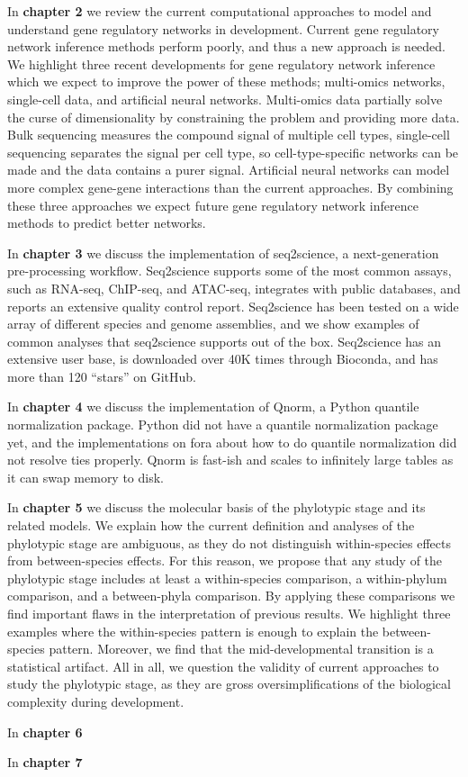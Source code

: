 In \textbf{chapter 2} we review the current computational approaches to model and understand gene regulatory networks in development. Current gene regulatory network inference methods perform poorly, and thus a new approach is needed. We highlight three recent developments for gene regulatory network inference which we expect to improve the power of these methods; multi-omics networks, single-cell data, and artificial neural networks. Multi-omics data partially solve the curse of dimensionality by constraining the problem and providing more data. Bulk sequencing measures the compound signal of multiple cell types, single-cell sequencing separates the signal per cell type, so cell-type-specific networks can be made and the data contains a purer signal. Artificial neural networks can model more complex gene-gene interactions than the current approaches. By combining these three approaches we expect future gene regulatory network inference methods to predict better networks.

In \textbf{chapter 3} we discuss the implementation of seq2science, a next-generation pre-processing workflow. Seq2science supports some of the most common assays, such as RNA-seq, ChIP-seq, and ATAC-seq, integrates with public databases, and reports an extensive quality control report. Seq2science has been tested on a wide array of different species and genome assemblies, and we show examples of common analyses that seq2science supports out of the box. Seq2science has an extensive user base\cite{Bright_2021,Xu_2020,Wester2021,SantosBarriopedro2021,Heuts2023,Tholen2023,Harlaar2022,LunaVelez2023,Neikes2023,Vierboom2021,Smits2020,Smits2022,Heuts2022,Rother2023}, is downloaded over 40K times through Bioconda, and has more than 120 ``stars'' on GitHub.

In \textbf{chapter 4} we discuss the implementation of Qnorm,  a Python quantile normalization package. Python did not have a quantile normalization package yet, and the implementations on fora about how to do quantile normalization did not resolve ties properly. Qnorm is fast-ish and scales to infinitely large tables as it can swap memory to disk.

In \textbf{chapter 5} we discuss the molecular basis of the phylotypic stage and its related models. We explain how the current definition and analyses of the phylotypic stage are ambiguous, as they do not distinguish within-species effects from between-species effects. For this reason, we propose that any study of the phylotypic stage includes at least a within-species comparison, a within-phylum comparison, and a between-phyla comparison. By applying these comparisons we find important flaws in the interpretation of previous results. We highlight three examples where the within-species pattern is enough to explain the between-species pattern. Moreover, we find that the mid-developmental transition is a statistical artifact. All in all, we question the validity of current approaches to study the phylotypic stage, as they are gross oversimplifications of the biological complexity during development.

In \textbf{chapter 6} 

In \textbf{chapter 7} 
